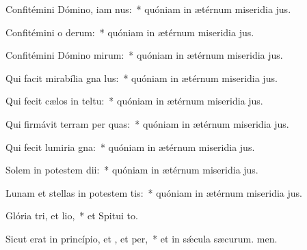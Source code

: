 \item Confitémini Dómino, iam nus:~* quóniam in ætérnum miseridia jus.
\item Confitémini o derum:~* quóniam in ætérnum miseridia jus.
\item Confitémini Dómino mirum:~* quóniam in ætérnum miseridia jus.
\item Qui facit mirabília gna lus:~* quóniam in ætérnum miseridia jus.
\item Qui fecit cælos in teltu:~* quóniam in ætérnum miseridia jus.
\item Qui firmávit terram per quas:~* quóniam in ætérnum miseridia jus.
\item Qui fecit lumiria gna:~* quóniam in ætérnum miseridia jus.
\item Solem in potestem dii:~* quóniam in ætérnum miseridia jus.
\item Lunam et stellas in potestem tis:~* quóniam in ætérnum miseridia jus.
\item Glória tri, et lio,~* et Spitui to.
\item Sicut erat in princípio, et , et per,~* et in sǽcula sæcurum. men.
